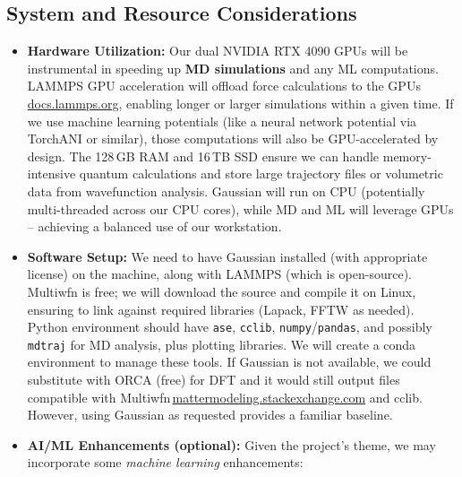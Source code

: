 \documentclass[11pt]{article}
\begin{document}
\subsection{System and Resource Considerations}
\begin{itemize}
  \item \textbf{Hardware Utilization:} Our dual NVIDIA RTX 4090 GPUs will be instrumental in speeding up \textbf{MD simulations} and any ML computations. LAMMPS GPU acceleration will offload force calculations to the GPUs\,\href{https://docs.lammps.org/Intro_overview.html\#:\~:text=clusters\%20and\%20supercomputers,threading\%2C\%20vectorization\%2C\%20and\%20GPU\%20acceleration}{docs.lammps.org}, enabling longer or larger simulations within a given time. If we use machine learning potentials (like a neural network potential via TorchANI or similar), those computations will also be GPU-accelerated by design. The 128\,GB RAM and 16\,TB SSD ensure we can handle memory-intensive quantum calculations and store large trajectory files or volumetric data from wavefunction analysis. Gaussian will run on CPU (potentially multi-threaded across our CPU cores), while MD and ML will leverage GPUs -- achieving a balanced use of our workstation.
  \item \textbf{Software Setup:} We need to have Gaussian installed (with appropriate license) on the machine, along with LAMMPS (which is open-source). Multiwfn is free; we will download the source and compile it on Linux, ensuring to link against required libraries (Lapack, FFTW as needed). Python environment should have \texttt{ase}, \texttt{cclib}, \texttt{numpy}/\texttt{pandas}, and possibly \texttt{mdtraj} for MD analysis, plus plotting libraries. We will create a conda environment to manage these tools. If Gaussian is not available, we could substitute with ORCA (free) for DFT and it would still output files compatible with Multiwfn\,\href{https://mattermodeling.stackexchange.com/questions/3493/quantifying-electronic-overlap\#:\~:text=,MRCC\%2C\%20deMon2k\%2C\%20Firefly\%2C\%20CFour\%2C\%20Turbomole}{mattermodeling.stackexchange.com} and cclib. However, using Gaussian as requested provides a familiar baseline.
  \item \textbf{AI/ML Enhancements (optional):} Given the project’s theme, we may incorporate some \emph{machine learning} enhancements:
  \begin{itemize}

\end{itemize}
\end{itemize}
\end{document}
